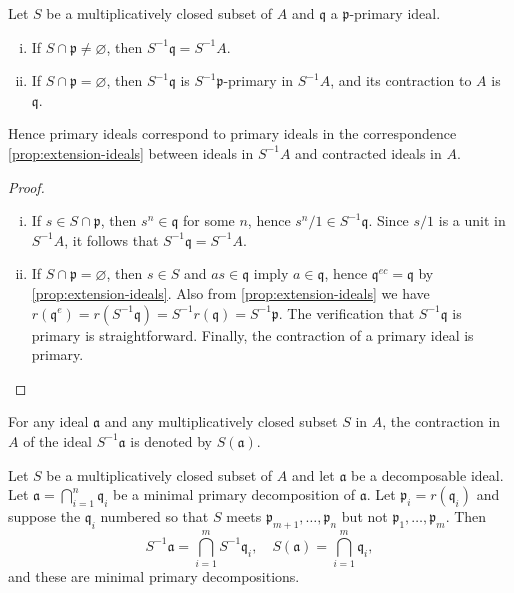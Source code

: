 \begin{proposition}\label{prop:localization-primary}
    Let $S$ be a multiplicatively closed subset of $A$ and $\mathfrak{q}$ a $\mathfrak{p}$-primary ideal.
    \begin{enumerate}[i)]
        \item If $S \cap \mathfrak{p} \neq \varnothing$, then $S^{-1}\mathfrak{q} = S^{-1}A$.
        \item If $S \cap \mathfrak{p} = \varnothing$, then $S^{-1}\mathfrak{q}$ is $S^{-1}\mathfrak{p}$-primary in $S^{-1}A$, and its contraction to $A$ is $\mathfrak{q}$.
    \end{enumerate}

    Hence primary ideals correspond to primary ideals in the correspondence \eqref{prop:extension-ideals} between ideals in $S^{-1}A$ and contracted ideals in $A$.
\end{proposition}
\begin{proof}
    \begin{enumerate}[i)]
        \item If $s \in S \cap \mathfrak{p}$, then $s^n \in \mathfrak{q}$ for some $n$, hence $s^n/1 \in S^{-1}\mathfrak{q}$. Since $s/1$ is a unit in $S^{-1}A$, it follows that $S^{-1}\mathfrak{q} = S^{-1}A$.
        \item If $S \cap \mathfrak{p} = \varnothing$, then $s \in S$ and $as \in \mathfrak{q}$ imply $a \in \mathfrak{q}$, hence $\mathfrak{q}^{ec} = \mathfrak{q}$ by \eqref{prop:extension-ideals}.
        Also from \eqref{prop:extension-ideals} we have $r(\mathfrak{q}^e) = r(S^{-1}\mathfrak{q}) = S^{-1}r(\mathfrak{q}) = S^{-1}\mathfrak{p}$. The verification that $S^{-1}\mathfrak{q}$ is primary is straightforward. Finally, the contraction of a primary ideal is primary. 
    \end{enumerate}
\end{proof}

For any ideal $\mathfrak{a}$ and any multiplicatively closed subset $S$ in $A$, the contraction in $A$ of the ideal $S^{-1}\mathfrak{a}$ is denoted by $S(\mathfrak{a})$.

\begin{proposition}\label{prop:localization-primary-decomposition}
    Let $S$ be a multiplicatively closed subset of $A$ and let $\mathfrak{a}$ be a decomposable ideal. Let $\mathfrak{a} = \bigcap_{i=1}^n \mathfrak{q}_i$ be a minimal primary decomposition of $\mathfrak{a}$. Let $\mathfrak{p}_i = r(\mathfrak{q}_i)$ and suppose the $\mathfrak{q}_i$ numbered so that $S$ meets $\mathfrak{p}_{m+1}, \dots, \mathfrak{p}_n$ but not $\mathfrak{p}_1, \dots, \mathfrak{p}_m$. Then
    \[
    S^{-1}\mathfrak{a} = \bigcap_{i=1}^m S^{-1}\mathfrak{q}_i, \quad S(\mathfrak{a}) = \bigcap_{i=1}^m \mathfrak{q}_i,
    \]
    and these are minimal primary decompositions.
\end{proposition}

